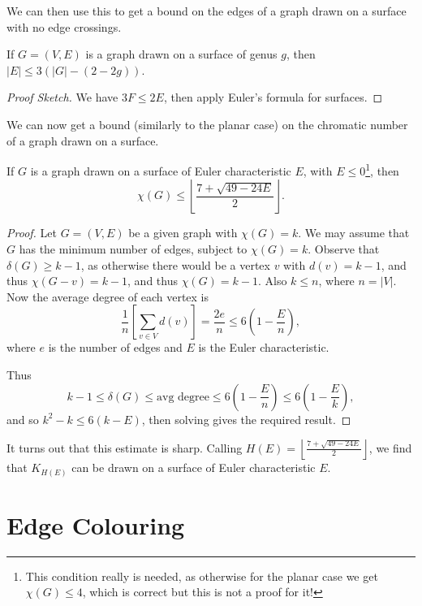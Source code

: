 \documentclass[a4paper]{scrreprt}
\begin{document}
We can then use this to get a bound on the edges of a graph drawn on a surface with no edge crossings.

\begin{proposition}
	If $G = (V, E)$ is a graph drawn on a surface of genus $g$, then $|E| \leq 3(|G| - (2 - 2g))$.
\end{proposition}
\begin{proof}[Proof Sketch]
	We have $3F \leq 2E$, then apply Euler's formula for surfaces.
\end{proof}

We can now get a bound (similarly to the planar case) on the chromatic number of a graph drawn on a surface.

\begin{theorem}
	If $G$ is a graph drawn on a surface of Euler characteristic $E$, with $E \leq 0$\footnote{This condition really is needed, as otherwise for the planar case we get $\chi(G) \leq 4$, which is correct but this is not a proof for it!}, then
	$$
	\chi(G) \leq \left\lfloor \frac{7 + \sqrt{49 - 24E}}{2}\right\rfloor.
	$$
\end{theorem}
\begin{proof}
	Let $G = (V, E)$ be a given graph with $\chi(G) = k$. We may assume that $G$ has the minimum number of edges, subject to $\chi(G) = k$.
	Observe that $\delta(G) \geq k - 1$, as otherwise there would be a vertex $v$ with $d(v) = k - 1$, and thus $\chi(G - v) = k - 1$, and thus $\chi(G) = k - 1$. Also $k \leq n$, where $n = |V|$. Now the average degree of each vertex is
	$$
	\frac{1}{n} \left[\sum_{v \in V}d(v)\right] = \frac{2e}{n} \leq 6\left(1 - \frac{E}{n}\right),
	$$
	where $e$ is the number of edges and $E$ is the Euler characteristic.

	Thus
	$$
	k - 1 \leq \delta(G) \leq \text{avg degree} \leq 6\left(1 - \frac{E}{n}\right) \leq 6\left(1 - \frac{E}{k}\right),
	$$
	and so $k^2 - k \leq 6(k - E)$, then solving gives the required result.
\end{proof}

\begin{remark}
	It turns out that this estimate is sharp. Calling $H(E) = \left\lfloor \frac{7 + \sqrt{49 - 24E}}{2}\right\rfloor$, we find that $K_{H(E)}$ can be drawn on a surface of Euler characteristic $E$.
\end{remark}

\section{Edge Colouring}
\end{document}
